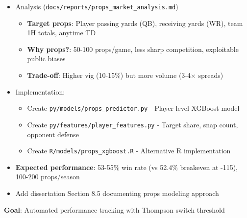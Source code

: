\begin{itemize}
  \item {} Analysis (\texttt{docs/reports/props\_market\_analysis.md})
  \begin{itemize}
    \item \textbf{Target props}: Player passing yards (QB), receiving yards (WR), team 1H totals, anytime TD
    \item \textbf{Why props?}: 50-100 props/game, less sharp competition, exploitable public biases
    \item \textbf{Trade-off}: Higher vig (10-15\%) but more volume (3-4$\times$ spreads)
  \end{itemize}
  \item {} Implementation:
  \begin{itemize}
    \item Create \texttt{py/models/props\_predictor.py} - Player-level XGBoost model
    \item Create \texttt{py/features/player\_features.py} - Target share, snap count, opponent defense
    \item Create \texttt{R/models/props\_xgboost.R} - Alternative R implementation
  \end{itemize}
  \item {} \textbf{Expected performance}: 53-55\% win rate (vs 52.4\% breakeven at -115), 100-200 props/season
  \item {} Add dissertation Section 8.5 documenting props modeling approach
\end{itemize}

\textbf{Goal}: Automated performance tracking with Thompson switch threshold

